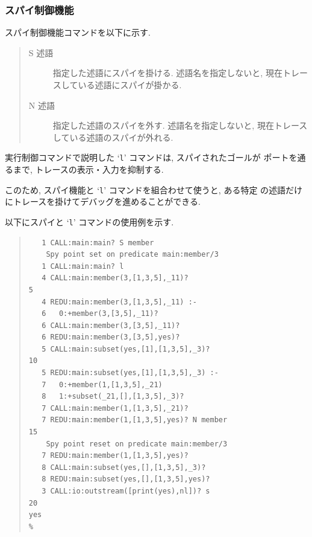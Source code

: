 \documentclass[a4,titlepage]{jsreport}
\begin{document}
\subsubsection{スパイ制御機能}
スパイ制御機能コマンドを以下に示す.  

\begin{quote}
\begin{description}
\item [S 述語] 指定した述語にスパイを掛ける.  
述語名を指定しないと, 現在トレースしている述語にスパイが掛かる.  

\item [N 述語] 指定した述語のスパイを外す.  
述語名を指定しないと, 現在トレースしている述語のスパイが外れる.  
\end{description}
\end{quote}

実行制御コマンドで説明した `{\tt l}' コマンドは, スパイされたゴールが
ポートを通るまで, トレースの表示・入力を抑制する.

このため, スパイ機能と `{\tt l}' コマンドを組合わせて使うと, ある特定
の述語だけにトレースを掛けてデバッグを進めることができる.

以下にスパイと `{\tt l}' コマンドの使用例を示す.  

\begin{quote}%
\begin{Verbatim}[frame=single,baselinestretch=0.8]
% subset -t                                                            1
   1 CALL:main:main? S member
	Spy point set on predicate main:member/3
   1 CALL:main:main? l
   4 CALL:main:member(3,[1,3,5],_11)?                                  5
   4 REDU:main:member(3,[1,3,5],_11) :-
   6   0:+member(3,[3,5],_11)? 
   6 CALL:main:member(3,[3,5],_11)? 
   6 REDU:main:member(3,[3,5],yes)? 
   5 CALL:main:subset(yes,[1],[1,3,5],_3)?                            10
   5 REDU:main:subset(yes,[1],[1,3,5],_3) :-
   7   0:+member(1,[1,3,5],_21)
   8   1:+subset(_21,[],[1,3,5],_3)? 
   7 CALL:main:member(1,[1,3,5],_21)? 
   7 REDU:main:member(1,[1,3,5],yes)? N member                        15
	Spy point reset on predicate main:member/3
   7 REDU:main:member(1,[1,3,5],yes)? 
   8 CALL:main:subset(yes,[],[1,3,5],_3)? 
   8 REDU:main:subset(yes,[],[1,3,5],yes)? 
   3 CALL:io:outstream([print(yes),nl])? s                            20
yes
% 
\end{Verbatim}
\end{quote}
\end{document}
